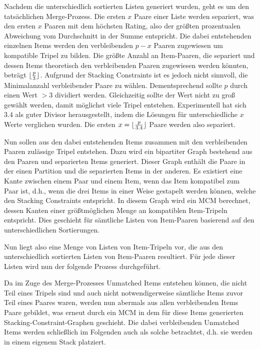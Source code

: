 Nachdem die unterschiedlich sortierten Listen generiert wurden, geht es um den tatsächlichen Merge-Prozess.
Die ersten $x$ Paare einer Liste werden separiert, was den ersten $x$ Paaren mit dem höchsten Rating, also der größten
prozentualen Abweichung vom Durchschnitt in der Summe entspricht. Die dabei entstehenden einzelnen Items werden den verbleibenden $p - x$ Paaren zugewiesen um kompatible Tripel zu bilden. Die größte Anzahl an Item-Paaren, die separiert und dessen Items theoretisch den verbleibenden
Paaren zugewiesen werden könnten, beträgt $\lfloor\frac{p}{3}\rfloor$. Aufgrund der Stacking Constraints ist es jedoch nicht sinnvoll, die Minimalanzahl
verbleibender Paare zu wählen. Dementsprechend sollte $p$ durch einen Wert $> 3$ dividiert werden. Gleichzeitig sollte der Wert nicht zu groß gewählt werden, damit möglichst viele Tripel entstehen. Experimentell hat sich $3.4$ als guter Divisor herausgestellt, indem die Lösungen für unterschiedliche $x$ Werte verglichen wurden. Die ersten $x = \lfloor\frac{p}{3.4}\rfloor$ Paare werden also separiert.

Nun sollen aus den dabei entstehenden Items zusammen mit den verbleibenden Paaren zulässige Tripel entstehen.
Dazu wird ein bipartiter Graph bestehend aus den Paaren und separierten Items generiert.
Dieser Graph enthält die Paare in der einen Partition und die separierten Items in der anderen.
Es existiert eine Kante zwischen einem Paar und einem Item, wenn das Item kompatibel zum Paar ist, d.h.,
wenn die drei Items in einer Weise gestapelt werden können, welche den Stacking Constraints entspricht.
In diesem Graph wird ein \textsc{MCM} berechnet, dessen Kanten einer größtmöglichen Menge an kompatiblen Item-Tripeln entspricht.
Dies geschieht für sämtliche Listen von Item-Paaren basierend auf den unterschiedlichen Sortierungen.

Nun liegt also eine Menge von Listen von Item-Tripeln vor, die aus den unterschiedlich sortierten Listen von Item-Paaren resultiert.
Für jede dieser Listen wird nun der folgende Prozess durchgeführt.

\pagebreak

Da im Zuge des Merge-Prozesses Unmatched Items entstehen können, die nicht Teil eines Tripels sind und auch nicht notwendigerweise
sämtliche Items zuvor Teil eines Paares waren, werden nun abermals aus allen verbleibenden Items Paare gebildet, was erneut durch ein \textsc{MCM}
in dem für diese Items generierten Stacking-Constraint-Graphen geschieht. Die dabei verbleibenden Unmatched Items werden schließlich
im Folgenden auch als solche betrachtet, d.h. sie werden in einem eigenem Stack platziert.

